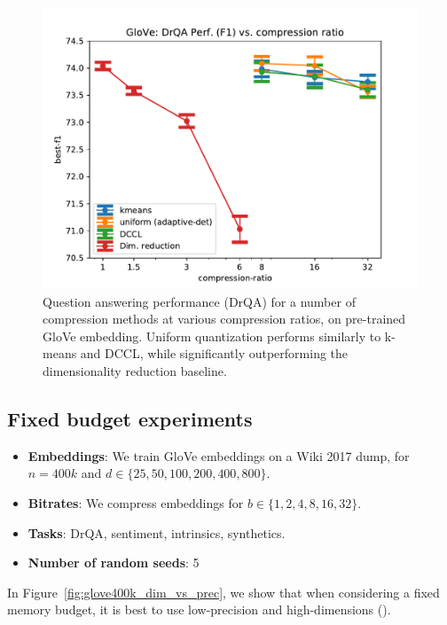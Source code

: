 \begin{figure}
\begin{center}
\centerline{\includegraphics[width=\columnwidth]{figures/glove400k_drqa_vs_compression.pdf}}
\caption{Question answering performance (DrQA) for a number of compression methods at various compression ratios, on pre-trained GloVe embedding.  Uniform quantization performs similarly to k-means and DCCL, while significantly outperforming the dimensionality reduction baseline. }
\label{fig:glove400k_drqa}
\end{center}
\end{figure}

\subsection{Fixed budget experiments}
\begin{itemize}
	\item \textbf{Embeddings}: We train GloVe embeddings on a Wiki 2017 dump, for $n=400k$ and $d \in \{25,50,100,200,400,800\}$.
	\item \textbf{Bitrates}: We compress embeddings for $b \in \{1,2,4,8,16,32\}$.
	\item \textbf{Tasks}: DrQA, sentiment, intrinsics, synthetics.
	\item \textbf{Number of random seeds}: 5
\end{itemize}

In Figure~\ref{fig:glove400k_dim_vs_prec}, we show that when considering a fixed memory budget, it is best to use low-precision and high-dimensions ().

